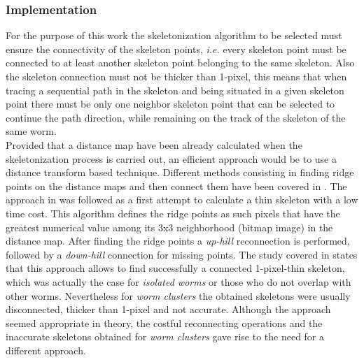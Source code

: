 \subsubsection{Implementation}
\label{sec:skeletonimp}

For the purpose of this work the skeletonization algorithm to be selected must
ensure the connectivity of the skeleton points, \emph{i.e.} every skeleton point
must be connected to at least another skeleton point belonging to the same
skeleton. Also the skeleton connection must not be thicker than 1-pixel, this means that
when tracing a sequential path in the skeleton and being situated in a given skeleton 
point there must be only one neighbor skeleton point that can be selected to continue
the path direction, while remaining on the track of the skeleton of the same worm.\\

Provided that a distance map have been already calculated when the skeletonization 
process is carried out, an efficient approach would be to use a distance transform
based technique. Different methods consisting in finding ridge points on the distance
maps and then connect them have been covered in \cite{maxima,euclideancentre,ridgeineuc}.
The approach in \cite{maxima} was followed as a first attempt to calculate a thin
skeleton with a low time cost. This algorithm defines the ridge points as such pixels
that have the greatest numerical value among its 3x3 neighborhood (bitmap image) in the 
distance map. After finding the ridge points a \emph{up-hill} reconnection is performed, 
followed by a \emph{down-hill} connection for missing points. The study covered in \cite{maxima}
states that this approach allows to find successfully a connected 1-pixel-thin skeleton,
which was actually the case for \emph{isolated worms} or those who do not
overlap with other worms. Nevertheless for \emph{worm clusters} the obtained skeletons
were usually disconnected, thicker than 1-pixel and not accurate. Although the approach
seemed appropriate in theory, the costful reconnecting operations and the inaccurate
skeletons obtained for \emph{worm clusters} gave rise to the need for a different
approach.\\

